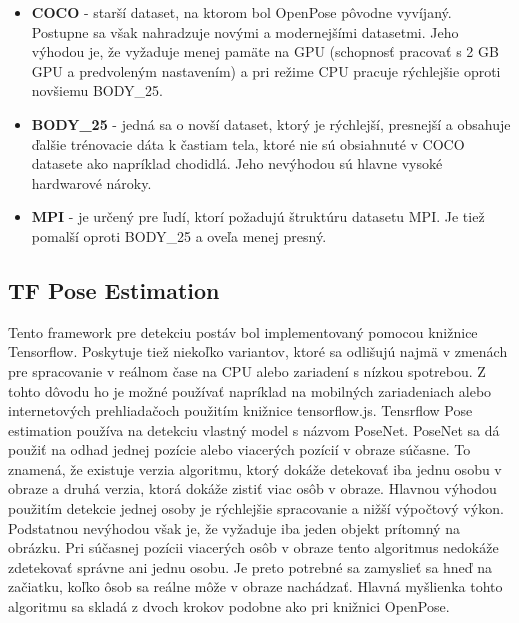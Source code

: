 \documentclass[slovak,master,dept460,male,cpp,cpdeclaration]{diploma}
\begin{document}
\begin{itemize}
\item \textbf{COCO} - starší dataset, na ktorom bol OpenPose pôvodne vyvíjaný. Postupne sa však nahradzuje novými a modernejšími datasetmi. Jeho výhodou je, že vyžaduje menej pamäte na GPU (schopnosť pracovať s 2 GB GPU a predvoleným nastavením) a pri režime CPU pracuje rýchlejšie oproti novšiemu BODY\_25.

\item \textbf{BODY\_25} - jedná sa o novší dataset, ktorý je rýchlejší, presnejší a obsahuje ďalšie trénovacie dáta k častiam tela, ktoré nie sú obsiahnuté v COCO datasete ako napríklad chodidlá. Jeho nevýhodou sú hlavne vysoké hardwarové nároky.

\item \textbf{MPI} - je určený pre ľudí, ktorí požadujú štruktúru datasetu MPI. Je tiež pomalší oproti BODY\_25 a oveľa menej presný.
\end{itemize}




\newpage
\subsection{TF Pose Estimation}
Tento framework pre detekciu postáv bol implementovaný pomocou knižnice Tensorflow. Poskytuje tiež niekoľko variantov, ktoré sa odlišujú najmä v zmenách pre spracovanie v reálnom čase na CPU alebo zariadení s nízkou spotrebou. Z tohto dôvodu ho je  možné používať napríklad na mobilných zariadeniach alebo internetových prehliadačoch použitím knižnice tensorflow.js. Tensrflow Pose estimation používa na detekciu  vlastný model s názvom PoseNet. PoseNet sa dá použiť na odhad jednej pozície alebo viacerých pozícií v obraze súčasne. To znamená, že existuje verzia algoritmu, ktorý dokáže detekovať iba jednu osobu v obraze a druhá verzia, ktorá dokáže zistiť viac osôb v obraze. Hlavnou výhodou použitím detekcie jednej osoby je rýchlejšie spracovanie a nižší výpočtový výkon. Podstatnou nevýhodou však je, že vyžaduje iba jeden objekt prítomný na obrázku. Pri súčasnej pozícii viacerých osôb v obraze tento algoritmus nedokáže zdetekovať správne ani jednu osobu. Je preto potrebné sa zamyslieť sa  hneď na začiatku, koľko ôsob sa reálne môže v obraze nachádzať. Hlavná myšlienka tohto algoritmu sa skladá z dvoch krokov podobne ako pri knižnici OpenPose.
\end{document}
